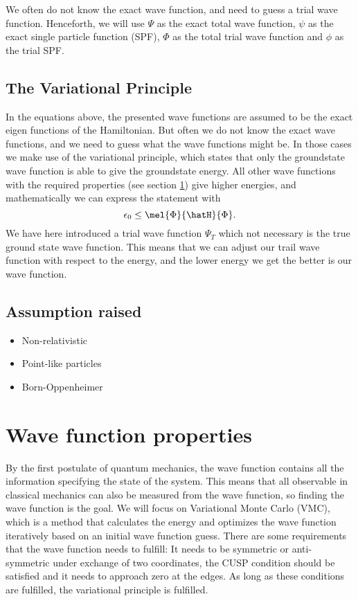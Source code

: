 We often do not know the exact wave function, and need to guess a trial wave function. Henceforth, we will use $\Psi$ as the exact total wave function, $\psi$ as the exact single particle function (SPF), $\Phi$ as the total trial wave function and $\phi$ as the trial SPF. 
\cite{GriffQuan}

\subsection{The Variational Principle}
In the equations above, the presented wave functions are assumed to be the exact eigen functions of the Hamiltonian. But often we do not know the exact wave functions, and we need to guess what the wave functions might be. In those cases we make use of the variational principle, which states that only the groundstate wave function is able to give the groundstate energy. All other wave functions with the required properties (see section \ref{subsec:wavefunction}) give higher energies, and mathematically we can express the statement with
\begin{equation}
\epsilon_0\leq\mel{\Phi}{\hatH}{\Phi}.
\end{equation}
We have here introduced a trial wave function $\Psi_T$ which not necessary is the true ground state wave function. This means that we can adjust our trail wave function with respect to the energy, and the lower energy we get the better is our wave function. 

\subsection{Assumption raised}
\begin{itemize}
	\item Non-relativistic
	\item Point-like particles
	\item Born-Oppenheimer
\end{itemize}

\section{Wave function properties} \label{subsec:wavefunction}
By the first postulate of quantum mechanics, the wave function contains all the information specifying the state of the system. This means that all observable in classical mechanics can also be measured from the wave function, so finding the wave function is the goal. We will focus on Variational Monte Carlo (VMC), which is a method that calculates the energy and optimizes the wave function iteratively based on an initial wave function guess. There are some requirements that the wave function needs to fulfill: It needs to be symmetric or anti-symmetric under exchange of two coordinates, the CUSP condition should be satisfied and it needs to approach zero at the edges. As long as these conditions are fulfilled, the variational principle is fulfilled. 

